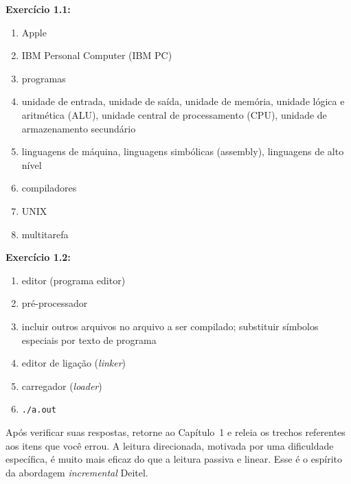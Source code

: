 \documentclass[12pt,a4paper]{article}
\begin{document}
\begin{tcolorbox}[colback=deitellightblue, colframe=deitelblue, title={\bfseries\large Gabarito Rápido -- Capítulo 1}, breakable]

\textbf{Exercício 1.1:}
\begin{enumerate}[label=\alph*)]
  \item Apple
  \item IBM Personal Computer (IBM PC)
  \item programas
  \item unidade de entrada, unidade de saída, unidade de memória, unidade lógica e aritmética (ALU), unidade central de processamento (CPU), unidade de armazenamento secundário
  \item linguagens de máquina, linguagens simbólicas (assembly), linguagens de alto nível
  \item compiladores
  \item UNIX
  \item multitarefa
\end{enumerate}

\medskip
\textbf{Exercício 1.2:}
\begin{enumerate}[label=\alph*)]
  \item editor (programa editor)
  \item pré-processador
  \item incluir outros arquivos no arquivo a ser compilado; substituir símbolos especiais por texto de programa
  \item editor de ligação (\textit{linker})
  \item carregador (\textit{loader})
  \item \texttt{./a.out}
\end{enumerate}
\end{tcolorbox}

\bigskip

\begin{boaprática}
  Após verificar suas respostas, retorne ao Capítulo~1 e releia os trechos
  referentes aos itens que você errou. A leitura direcionada, motivada por uma
  dificuldade específica, é muito mais eficaz do que a leitura passiva e linear.
  Esse é o espírito da abordagem \textit{incremental} Deitel.
\end{boaprática}
\end{document}
